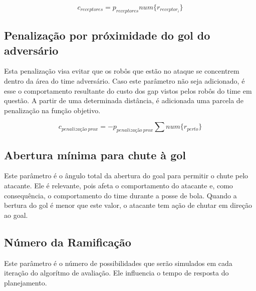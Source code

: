 \begin{dmath}
  c_{receptores} = p_{receptores}
   num \lbrace r_{receptor_i} \rbrace
\end{dmath}

\subsection{Penalização por próximidade do gol do adversário}
Esta penalização visa evitar que os robôs que estão no ataque
se concentrem dentro da área do time adversário. Caso este
parâmetro não seja adicionado, é esse o comportamento resultante
do custo dos gap vistos pelos robôs do time em questão. 
A partir de uma determinada distância, é adicionada uma parcela
de penalização na função objetivo.

\begin{dmath}
  c_{penalização{\ }prox} = - p_{penalização{\ }prox}
    \sum num \lbrace r_{perto} \rbrace
\end{dmath}

\subsection{Abertura mínima para chute à gol}
Este parâmetro é o ângulo total da abertura do goal para permitir
o chute pelo atacante. Ele é relevante, pois afeta o comportamento
do atacante e, como consequência, o comportamento do time durante
a posse de bola. Quando a bertura do gol é menor que este valor, o
atacante tem ação de chutar em direção ao goal.


\subsection{Número da Ramificação}
Este parâmetro é o número de possibilidades que serão simulados
em cada iteração do algorítmo de avaliação. Ele influencia o
tempo de resposta do planejamento.
